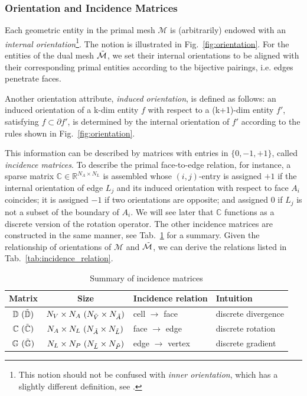 \documentclass{article}
\begin{document}
\subsubsection{Orientation and Incidence Matrices}

Each geometric entity in the primal mesh $\mathcal{M}$ is (arbitrarily) endowed with an
\emph{internal orientation}\footnote{This notion should not be confused with \emph{inner
    orientation}, which has a slightly different definition, see
  \cite[][Sec. 3.1]{tonti_2002}.}. The notion is illustrated in
Fig.~\ref{fig:orientation}. For the entities of the dual mesh $\Tilde{\mathcal{M}}$, we
set their internal orientations to be aligned with their corresponding primal entities
according to the bijective pairings, i.e. edges penetrate faces.

Another orientation attribute, \emph{induced orientation}, is defined as follows: an induced orientation of a k-dim entity $f$ with respect to a (k+1)-dim entity $f'$, satisfying $f \subset \partial f' $, is determined by the internal orientation of $f'$ according to the rules shown in Fig.~\ref{fig:orientation}. 

This information can be described by matrices with entries in $\{0,-1,+1\}$, called \emph{incidence matrices}. To describe the primal face-to-edge relation, for instance, a sparse matrix $\mathbb{C} \in \mathbb{R}^{N_A \times N_L}$ is assembled whose $(i,j)$-entry is assigned $+1$ if the internal orientation of edge $L_j$ and its induced orientation with respect to face $A_i$ coincides; it is assigned $-1$ if two orientations are opposite; and assigned $0$ if $L_j$ is not a subset of the boundary of $A_i$. We will see later that $\mathbb{C}$ functions as a discrete version of the rotation operator. The other incidence matrices are constructed in the same manner, see Tab.~\ref{tab:incidence_mat} for a summary. Given the relationship of orientations of $\mathcal{M}$ and $\Tilde{\mathcal{M}}$, we can derive the relations listed in Tab.~\ref{tab:incidence_relation}.  

\begin{table}[h!]
    \centering
    \begin{tabular}{c c l l}
    \hline
         Matrix & Size & Incidence relation & Intuition  \\
    \hline
         $\mathbb{D}\ (\Tilde{\mathbb{D}})$ & $N_V \times N_A\ (N_{\Tilde{V}} \times N_{\Tilde{A}})$ & cell $\rightarrow$ face & discrete divergence \\
         $\mathbb{C}\ (\Tilde{\mathbb{C}})$ & $N_A \times N_L\ (N_{\Tilde{A}} \times N_{\Tilde{L}})$ & face $\rightarrow$ edge & discrete rotation \\
         $\mathbb{G}\ (\Tilde{\mathbb{G}})$ & $N_L \times N_P\ (N_{\Tilde{L}} \times N_{\Tilde{P}})$ & edge $\rightarrow$ vertex & discrete gradient
         \\
    \hline
    \end{tabular}
    \caption{Summary of incidence matrices}
    \label{tab:incidence_mat}
\end{table}
\end{document}
